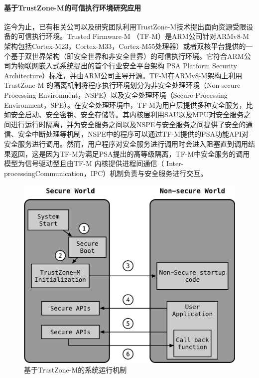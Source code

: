 \documentclass[12pt,a4paper]{ctexart}
\begin{document}
\paragraph{基于TrustZone-M的可信执行环境研究应用}
\par 迄今为止，已有相关公司以及研究团队利用TrustZone-M技术提出面向资源受限设备的可信执行环境。Trusted Firmware-M （TF-M）是ARM公司针对ARMv8-M架构包括Cortex-M23，Cortex-M33，Cortex-M55处理器）或者双核平台提供的一个基于双世界架构（即安全世界和非安全世界）的可信执行环境。它符合ARM公司为物联网嵌入式系统提出的首个行业安全平台架构 PSA Platform Security Architecture）标准，并由ARM公司主导开源。TF-M在ARMv8-M架构上利用TrustZone-M 的隔离机制将程序执行环境划分为非安全处理环境（Non-secure Processing Environment，NSPE）以及安全处理环境（Secure Processing Environment，SPE）。在安全处理环境中，TF-M为用户层提供多种安全服务，比如安全启动、安全密钥、安全存储等。其内核层利用SAU以及MPU对安全服务之间进行运行时隔离，并为安全服务之间以及NSPE与安全服务之间提供了安全的通信、安全中断处理等机制，NSPE中的程序可以通过TF-M提供的PSA功能API对安全服务进行调用。然而，用户程序对安全服务进行调用时会进入阻塞直到调用结果返回，这是因为TF-M为满足PSA提出的高等级隔离，TF-M中安全服务的调用模型为信号驱动型且由TF-M 内核提供进程间通信（ Inter-processingCommunication，IPC）机制负责与安全服务进行交互。
\begin{figure}
    \centering
    \includegraphics[scale=0.5]{graph/2.png}
    \caption{基于TrustZone-M的系统运行机制}
\end{figure}
\end{document}
